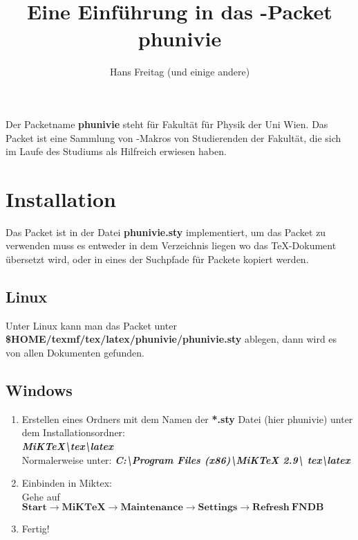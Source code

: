 \documentclass[a4paper]{article}
\begin{document}
\title{Eine Einführung in das \LaTeXe-Packet phunivie}
\author{Hans Freitag (und einige andere)}
\maketitle 

Der Packetname {\bf phunivie} steht für Fakultät für Physik der Uni Wien. 
Das Packet ist eine Sammlung von \LaTeXe-Makros von Studierenden der Fakultät, 
die sich im Laufe des Studiums als Hilfreich erwiesen haben. 

\tableofcontents

\section{Installation}

Das Packet ist in der Datei {\bf phunivie.sty} implementiert, um das Packet zu 
verwenden muss es entweder in dem Verzeichnis liegen wo das \TeX-Dokument 
übersetzt wird, oder in eines der Suchpfade für Packete kopiert werden.\\

\subsection{Linux}

Unter Linux kann man das Packet unter  {\bf
\$HOME/texmf/tex/latex/phunivie/phunivie.sty} ablegen, dann wird es von allen 
Dokumenten gefunden. \\

\subsection{Windows}
\begin{enumerate}
	\item Erstellen eines Ordners mit dem Namen der \textbf{\textbf{*.sty}} 
		Datei (hier phunivie) unter dem Installationsordner:\\

		\textbf{\emph{MiKTeX\textbackslash tex\textbackslash latex}}\\
		Normalerweise unter: \textbf{\emph{C:\textbackslash Program 
		Files (x86)\textbackslash MiKTeX 2.9\textbackslash 
		tex\textbackslash latex}}

	\item Einbinden in Miktex:\\
			Gehe auf $\boldsymbol{Start \rightarrow MiKTeX \rightarrow 
			Maintenance \rightarrow Settings \rightarrow Refresh~FNDB}$

	\item Fertig!
\end{enumerate}
\end{document}
